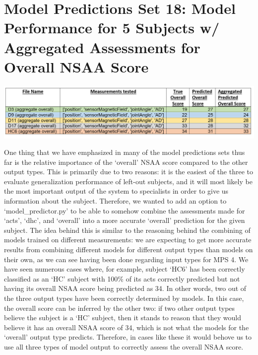 \documentclass[12pt,twoside]{report}
\begin{document}
\section{Model Predictions Set 18: Model Performance for 5 Subjects w/ Aggregated Assessments for Overall NSAA Score}

\begin{center}
\includegraphics[scale=0.4]{project_figures/fig11_25}
\end{center}

\quad One thing that we have emphasized in many of the model predictions sets thus far is the relative importance of the ‘overall’ NSAA score compared to the other output types. This is primarily due to two reasons: it is the easiest of the three to evaluate generalization performance of left-out subjects, and it will most likely be the most important output of the system to specialists in order to give us information about the subject. Therefore, we wanted to add an option to ‘model\_predictor.py’ to be able to somehow combine the assessments made for ‘acts’, ‘dhc’, and ‘overall’ into a more accurate ‘overall’ prediction for the given subject. The idea behind this is similar to the reasoning behind the combining of models trained on different measurements: we are expecting to get more accurate results from combining different models for different output types than models on their own, as we can see having been done regarding input types for MPS 4. We have seen numerous cases where, for example, subject ‘HC6’ has been correctly classified as an ‘HC’ subject with 100\% of its acts correctly predicted but not having its overall NSAA score being predicted as 34. In other words, two out of the three output types have been correctly determined by models. In this case, the overall score can be inferred by the other two: if two other output types believe the subject is a ‘HC’ subject, then it stands to reason that they would believe it has an overall NSAA score of 34, which is not what the models for the ‘overall’ output type predicts. Therefore, in cases like these it would behove us to use all three types of model output to correctly assess the overall NSAA score.\\
\end{document}
